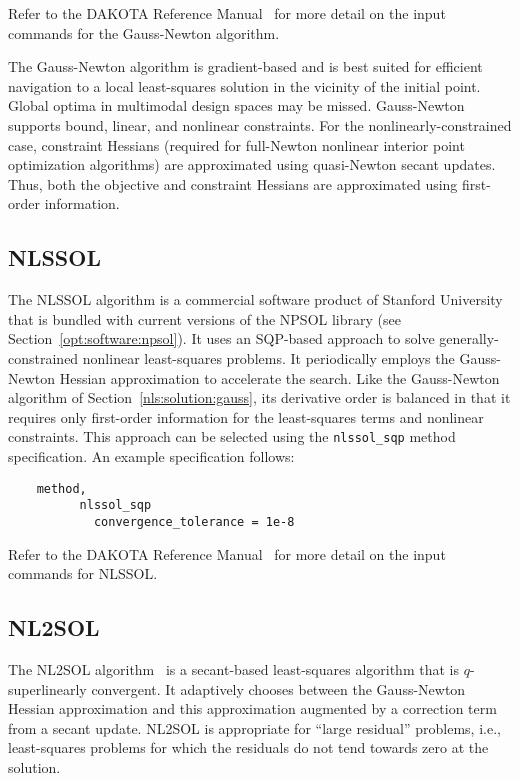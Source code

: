 Refer to the DAKOTA Reference Manual~\cite{RefMan} for more detail on the
input commands for the Gauss-Newton algorithm.

The Gauss-Newton algorithm is gradient-based and is best suited for
efficient navigation to a local least-squares solution in the vicinity
of the initial point. Global optima in multimodal design spaces may be
missed. Gauss-Newton supports bound, linear, and nonlinear
constraints. For the nonlinearly-constrained case, constraint Hessians
(required for full-Newton nonlinear interior point optimization
algorithms) are approximated using quasi-Newton secant updates.  Thus,
both the objective and constraint Hessians are approximated using
first-order information.

\subsection{NLSSOL}\label{nls:solution:nlssol}

The NLSSOL algorithm is a commercial software product of Stanford
University that is bundled with current versions of the NPSOL library
(see Section~\ref{opt:software:npsol}).  It uses an SQP-based approach
to solve generally-constrained nonlinear least-squares problems. It
periodically employs the Gauss-Newton Hessian approximation to
accelerate the search. Like the Gauss-Newton algorithm of
Section~\ref{nls:solution:gauss}, its derivative order is balanced in
that it requires only first-order information for the least-squares
terms and nonlinear constraints. This approach can be selected using
the \texttt{nlssol\_sqp} method specification. An example
specification follows:
\begin{small}
\begin{verbatim}
    method,
          nlssol_sqp
            convergence_tolerance = 1e-8
\end{verbatim}
\end{small}

Refer to the DAKOTA Reference Manual~\cite{RefMan} for more detail on the
input commands for NLSSOL.

\subsection{NL2SOL}\label{nls:solution:nl2sol}

The NL2SOL algorithm~\cite{Den81} is a secant-based least-squares
algorithm that is $q$-superlinearly convergent.  It adaptively chooses
between the Gauss-Newton Hessian approximation and this approximation
augmented by a correction term from a secant update.
NL2SOL is appropriate
for ``large residual'' problems, i.e., least-squares problems for
which the residuals do not tend towards zero at the solution.

